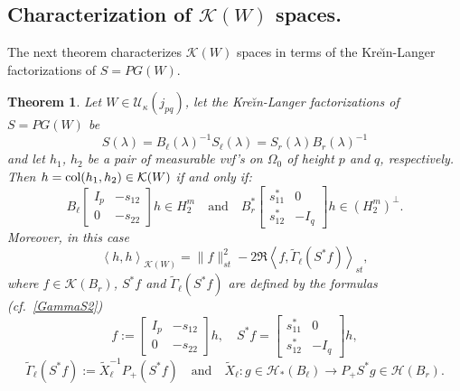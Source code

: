 \documentclass[12pt,twoside,a4paper]{amsart}
\newtheorem{thm}{Theorem}[section]
\theoremstyle{definition}
\numberwithin{equation}{section}
\begin{document}
\subsection{Characterization of ${{\mathcal K}}(W)$ spaces.}
The next theorem characterizes ${{\mathcal K}}(W)$ spaces in
terms of the Kre\u{\i}n-Langer factorizations of  $S=PG(W)$.
\begin{thm}\label{cHW}
Let $W\in  {{\mathcal U}}_\kappa(j_{pq})$, let the Kre\u{\i}n-Langer factorizations
of $S=PG(W)$ be
\[
S({\lambda})=B_{\ell}({\lambda})^{-1}S_{\ell}({\lambda})=S_r({\lambda})B_r({\lambda})^{-1}
\]
and let $h_1$, $h_2$ be a pair of measurable vvf's on $\Omega_0$ of
height $p$ and $q$, respectively. Then $h=\textup{col}(h_1,h_2)\in{{\mathcal K}}(W)$
if and only if:
$$
B_{\ell}\left[\begin{array}{cc}
  I_p & -s_{12} \\
  0 & -s_{22}
\end{array}  \right]h\in H_2^m\quad\text{and}\quad
B_r^*\left[\begin{array}{cc}
  s_{11}^* & 0 \\
  s_{12}^* & -I_q
\end{array}  \right]h\in (H_2^m)^\perp.
$$
Moreover, in this case
\begin{equation}\label{cHWinnerPr}
\left\langle h,h\right\rangle_{{{\mathcal K}}(W)}=\|f\|_{st}^2
-2\Re\left\langle f,{{{\widetilde \Gamma} }}_{\ell}(S^*f)\right\rangle_{st},
\end{equation}
where $f\in{{\mathcal K}}(B_r)$, $S^*f$ and ${{{\widetilde \Gamma} }}_{\ell}(S^*f)$ are
defined by the formulas (cf.~\eqref{GammaS2})
\begin{equation}\label{fS*f}
    f:=\left[\begin{array}{cc}
  I_p & -s_{12} \\
  0 & -s_{22}
\end{array}  \right]
h,\quad
S^* f=\left[\begin{array}{cc}
  s_{11}^* & 0 \\
  s_{12}^* & -I_q
\end{array}  \right]h,
\end{equation}
$$ {{{\widetilde \Gamma} }}_{\ell} (S^*f):=\widetilde{X}_{\ell}^{-1}P_+(S^*f)\quad
\textrm{and} \quad \widetilde{X}_{\ell}:g\in{{\mathcal H}}_*(B_\ell)\longrightarrow
P_+S^*g\in{{\mathcal H}}(B_r).
$$
\end{thm}
\end{document}
